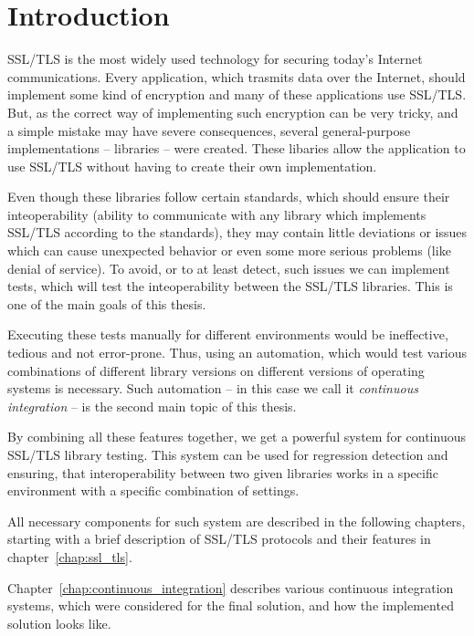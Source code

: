 
\chapter{Introduction}
    SSL/TLS is the most widely used technology for securing today's Internet communications.
    Every application, which trasmits data over the Internet, should implement
    some kind of encryption and many of these applications use SSL/TLS. But, as
    the correct way of implementing such encryption can be very tricky, and
    a simple mistake may have severe consequences, several general-purpose
    implementations -- libraries -- were created. These libaries allow the
    application to use SSL/TLS without having to create their own implementation.

    Even though these libraries follow certain standards, which should ensure
    their inteoperability (ability to communicate with any library which
    implements SSL/TLS according to the standards), they may contain little
    deviations or issues which can cause unexpected behavior or even some more
    serious problems (like denial of service). To avoid,
    or to at least detect, such issues we can implement tests, which will test the
    inteoperability between the SSL/TLS libraries. This is one of the main
    goals of this thesis.

    Executing these tests manually for different environments would be ineffective,
    tedious and not error-prone.
    Thus, using an automation, which would test various combinations of different
    library versions on different versions of operating systems is necessary.
    Such automation -- in this case we call it \textit{continuous integration} -- is
    the second main topic of this thesis.

    By combining all these features together, we get a powerful system for continuous
    SSL/TLS library testing. This system can be used for regression detection
    and ensuring, that interoperability between two given libraries works in a specific
    environment with a specific combination of settings.

    All necessary components
    for such system are described in the following chapters, starting with a
    brief description of SSL/TLS protocols and their features in
    chapter~\ref{chap:ssl_tls}.

    Chapter~\ref{chap:continuous_integration}
    describes various continuous integration systems, which were considered
    for the final solution, and how the implemented solution looks like.

